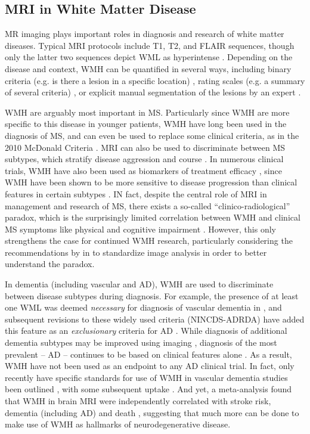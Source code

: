 \subsection{MRI in White Matter Disease}
MR imaging plays important roles in diagnosis and research of white matter diseases. Typical MRI protocols include T1, T2, and FLAIR sequences, though only the latter two sequences depict WML as hyperintense \cite{Simon2006,Wardlaw2013}. Depending on the disease and context, WMH can be quantified in several ways, including binary criteria (e.g. is there a lesion in a  specific location) \cite{Polman2011,Roman1993}, rating scales (e.g. a summary of several criteria) \cite{Fazekas1987}, or explicit manual segmentation of the lesions by an expert \cite{Egger2017}. 
\par
WMH are arguably most important in MS. Particularly since WMH are more specific to this disease in younger patients, WMH have long been used in the diagnosis of MS, and can even be used to replace some clinical criteria, as in the 2010 McDonald Criteria \cite{Polman2011}. MRI can also be used to discriminate between MS subtypes, which stratify disease aggression and course \cite{Polman2011,Lublin2014,Traboulsee2015}. In numerous clinical trials, WMH have also been used as biomarkers of treatment efficacy \cite{Sormani2013,Fahrbach2013,Ziemssen2015}, since WMH have been shown to be more sensitive to disease progression than clinical features in certain subtypes \cite{ORiordan1998}. IN fact, despite the central role of MRI in management and research of MS, there exists a so-called ``clinico-radiological'' paradox, which is the surprisingly limited correlation between WMH and clinical MS symptoms like physical and cognitive impairment \cite{Mollison2017}. However, this only strengthens the case for continued WMH research, particularly considering the recommendations by \citeauthor{Mollison2017} in \cite{Mollison2017} to standardize image analysis in order to better understand the paradox.
\par
In dementia (including vascular and AD), WMH are used to discriminate between disease subtypes during diagnosis. For example, the presence of at least one WML was deemed \textit{necessary} for diagnosis of vascular dementia in \citeyear{Roman1993} \cite{Roman1993}, and subsequent revisions to these widely used criteria (NINCDS-ADRDA) have added this feature as an \textit{exclusionary} criteria for AD \cite{Dubois2007}. While diagnosis of additional dementia subtypes may be improved using imaging \cite{Sorbi2012,Verhagen2016}, diagnosis of the most prevalent -- AD -- continues to be based on clinical features alone \cite{McKhann2011}. As a result, WMH have not been used as an endpoint to any AD clinical trial. In fact, only recently have specific standards for use of WMH in vascular dementia studies been outlined \cite{Wardlaw2013,Wardlaw2015}, with some subsequent uptake \cite{VanWesten2016}. And yet, a \citeyear{Debette2010} meta-analysis found that WMH in brain MRI were independently correlated with stroke risk, dementia (including AD) and death \cite{Debette2010}, suggesting that much more can be done to make use of WMH as hallmarks of neurodegenerative disease.

